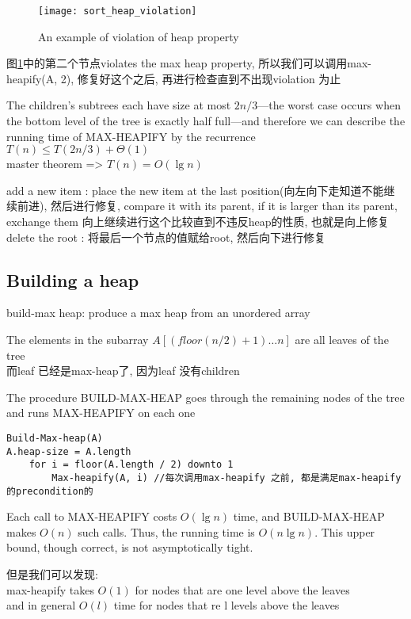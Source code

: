 \documentclass{article}
\begin{document}
\begin{figure}[htbp]
  \centering
  \texttt{[image: sort\_heap\_violation]}
  \caption{An example of violation of heap property}\label{fig.sort.heap.violation}
\end{figure}
图\ref{fig.sort.heap.violation}中的第二个节点violates the max heap property, 所以我们可以调用max-heapify(A, 2), 修复好这个之后, 再进行检查直到不出现violation 为止

The children's subtrees each have size at most $2n/3$—the worst case occurs when the bottom level of the tree is exactly half full—and therefore we can describe the running time of MAX-HEAPIFY by the recurrence\\
$T(n) \leq T(2n/3) +\Theta(1)$\\
master theorem => $T(n) = O(\lg n)$

add a new item : place the new item at the last position(向左向下走知道不能继续前进), 然后进行修复, compare it with its parent, if it is larger than its parent, exchange them 向上继续进行这个比较直到不违反heap的性质, 也就是向上修复\\
delete the root : 将最后一个节点的值赋给root, 然后向下进行修复

\subsection{Building a heap}
build-max heap: produce a max heap from an unordered array

The elements in the subarray $A[(floor(n/2)+ 1)…n]$ are all leaves of the tree\\
而leaf 已经是max-heap了, 因为leaf 没有children

The procedure BUILD-MAX-HEAP goes through the remaining nodes of the tree and runs MAX-HEAPIFY on each one
\begin{verbatim}
Build-Max-heap(A)
A.heap-size = A.length
    for i = floor(A.length / 2) downto 1
        Max-heapify(A, i) //每次调用max-heapify 之前, 都是满足max-heapify的precondition的
\end{verbatim}

Each call to MAX-HEAPIFY costs $O(\lg n)$ time, and BUILD-MAX-HEAP makes $O(n)$ such calls. Thus, the running time is $O(n\lg n )$. This upper bound, though correct, is not asymptotically tight.

但是我们可以发现:\\
max-heapify takes $O(1)$ for nodes that are one level above the leaves\\
and in general $O(l)$ time for nodes that re l levels above the leaves
\end{document}
